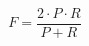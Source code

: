 \documentclass{article}
\begin{document}
\[F = \frac{2 \cdot P \cdot R}{P + R}\]







\end{document}
